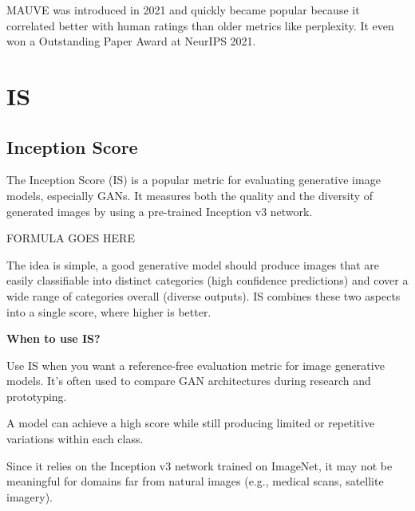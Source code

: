 \clearpage

\thispagestyle{customstyle}

{MAUVE was introduced in 2021 and quickly became popular because it correlated better with human ratings than older metrics like perplexity.
It even won a Outstanding Paper Award at NeurIPS 2021.}


\clearpage
\thispagestyle{genaistyle}
\section{IS}
\subsection{Inception Score}

The Inception Score (IS) is a popular metric for evaluating generative image models, especially GANs. It measures both the quality and the
diversity of generated images by using a pre-trained Inception v3 network.

\begin{center}
    FORMULA GOES HERE
\end{center}

The idea is simple, a good generative model should produce images that are easily classifiable into distinct categories (high confidence
predictions) and cover a wide range of categories overall (diverse outputs). IS combines these two aspects into a single score,
where higher is better.

\textbf{When to use IS?}

Use IS when you want a reference-free evaluation metric for image generative models.
It’s often used to compare GAN architectures during research and prototyping.


{
\item A model can achieve a high score while still producing limited or repetitive variations within each class.
\item Since it relies on the Inception v3 network trained on ImageNet, it may not be meaningful for domains far from natural
images (e.g., medical scans, satellite imagery).
}

\clearpage

